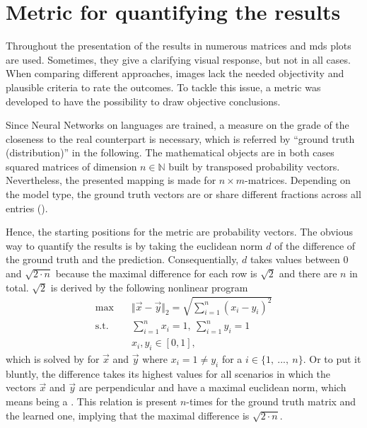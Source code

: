 \section{Metric for quantifying the results} \label{sec: metric}
Throughout the presentation of the results in  numerous matrices and \gls{mds} plots are used. Sometimes, they give a clarifying visual response, but not in all cases. When comparing different approaches, images lack the needed objectivity and plausible criteria to rate the outcomes. To tackle this issue, a metric was developed to have the possibility to draw objective conclusions.

Since Neural Networks on languages are trained, a measure on the grade of the closeness to the real counterpart is necessary, which is referred by ``ground truth (distribution)'' in the following. The mathematical objects are in both cases squared matrices of dimension $ n \in \mathbb{N} $ built by transposed probability vectors. Nevertheless, the presented mapping is made for $ n \times m $-matrices. Depending on the model type, the ground truth vectors are  or share different fractions across all entries ().

Hence, the starting positions for the metric are probability vectors. The obvious way to quantify the results is by taking the euclidean norm $ d $ of the difference of the ground truth and the prediction. Consequentially, $ d $ takes values between $ 0 $ and $ \sqrt{2 \cdot n} $ because the maximal difference for each row is $ \sqrt{2} $ and there are $ n $ in total. $ \sqrt{2} $ is derived by the following nonlinear program
\begin{align}
	\mathrm{max} 	& \quad \Vert \vec{x} - \vec{y}\Vert_2 = \sqrt{\sum_{i=1}^{n} (x_i - y_i)^2} \nonumber\\
	\mathrm{s.t.} 	& \quad \sum_{i=1}^{n} x_i = 1, \ \sum_{i=1}^{n} y_i = 1\\
					& \quad x_i, y_i \in [0,1] \nonumber
	\text{,}
\end{align}
which is solved by  for $ \vec{x} $ and $ \vec{y} $ where $ x_i = 1 \neq y_i$ for a $ i \in \{1, \ ..., \ n\} $. Or to put it bluntly, the difference takes its highest values for all scenarios in which the vectors $ \vec{x} $ and $ \vec{y} $ are perpendicular and have a maximal euclidean norm, which means being a \onehot{}. This relation is present $ n $-times for the ground truth matrix and the learned one, implying that the maximal difference is $ \sqrt{2 \cdot n} $.

